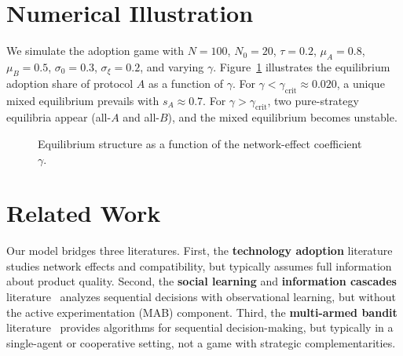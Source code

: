 \documentclass[12pt,a4paper]{article}
\begin{document}
\section{Numerical Illustration}

We simulate the adoption game with $N=100$, $N_0=20$, $\tau=0.2$,
$\mu_A=0.8$, $\mu_B=0.5$, $\sigma_0=0.3$, $\sigma_\xi=0.2$, and
varying $\gamma$.  Figure~\ref{fig:equilibrium} illustrates the equilibrium
adoption share of protocol $A$ as a function of $\gamma$.  For
$\gamma<\gamma_{\text{crit}}\approx0.020$, a unique mixed equilibrium
prevails with $s_A\approx0.7$.  For $\gamma>\gamma_{\text{crit}}$, two
pure-strategy equilibria appear (all-$A$ and all-$B$), and the mixed
equilibrium becomes unstable.

\begin{figure}[tb]
\centering
\caption{Equilibrium structure as a function of the network-effect
         coefficient $\gamma$.}
\label{fig:equilibrium}
\end{figure}

\section{Related Work}

Our model bridges three literatures.  First, the \textbf{technology adoption}
literature~\citep{katz1986technology,farrell1985standardization} studies
network effects and compatibility, but typically assumes full information
about product quality.  Second, the \textbf{social learning} and
\textbf{information cascades} literature~\citep{bikhchandani1992theory,
banerjee1992simple} analyzes sequential decisions with observational
learning, but without the active experimentation (MAB) component.
Third, the \textbf{multi-armed bandit} literature~\citep{lattimore2020bandit}
provides algorithms for sequential decision-making, but typically in a
single-agent or cooperative setting, not a game with strategic
complementarities.
\end{document}
